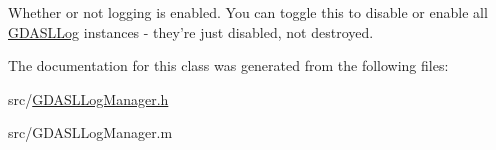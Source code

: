 Whether or not logging is enabled. You can toggle this to disable or enable all \hyperlink{interface_g_d_a_s_l_log}{GDASLLog} instances -\/ they're just disabled, not destroyed. 

The documentation for this class was generated from the following files:\begin{DoxyCompactItemize}
\item 
src/\hyperlink{_g_d_a_s_l_log_manager_8h}{GDASLLogManager.h}\item 
src/GDASLLogManager.m\end{DoxyCompactItemize}
